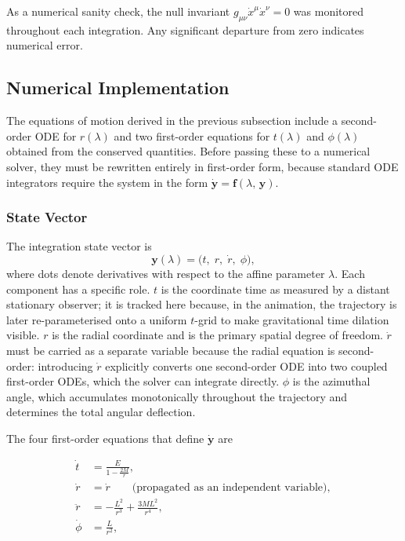 \documentclass[12pt,a4paper]{article}
\begin{document}
As a numerical sanity check, the null invariant $g_{\mu\nu}\dot{x}^\mu\dot{x}^\nu = 0$ was monitored throughout each integration. Any significant departure from zero indicates numerical error.

\subsection{Numerical Implementation}

\label{subsec:numerical_implementation}

The equations of motion derived in the previous subsection include a second-order ODE for $r(\lambda)$ and two first-order equations for $t(\lambda)$ and $\phi(\lambda)$ obtained from the conserved quantities. Before passing these to a numerical solver, they must be rewritten entirely in first-order form, because standard ODE integrators require the system in the form $\dot{\mathbf{y}} = \mathbf{f}(\lambda,\,\mathbf{y})$.

\subsubsection{State Vector}
The integration state vector is
\begin{equation}
    \mathbf{y}(\lambda) = \bigl(t,\; r,\; \dot{r},\; \phi\bigr),
    \label{eq:state_vector}
\end{equation}
where dots denote derivatives with respect to the affine parameter $\lambda$. Each component has a specific role. $t$ is the coordinate time as measured by a distant stationary observer; it is tracked here because, in the animation, the trajectory is later re-parameterised onto a uniform $t$-grid to make gravitational time dilation visible. $r$ is the radial coordinate and is the primary spatial degree of freedom. $\dot{r}$ must be carried as a separate variable because the radial equation is second-order: introducing $\dot{r}$ explicitly converts one second-order ODE into two coupled first-order ODEs, which the solver can integrate directly. $\phi$ is the azimuthal angle, which accumulates monotonically throughout the trajectory and determines the total angular deflection.

The four first-order equations that define $\dot{\mathbf{y}}$ are

\begin{align}
    \dot{t}    &= \frac{E}{\displaystyle 1 - \frac{2M}{r}},
    \label{eq:tdot} \\[6pt]
    \dot{r}    &= \dot{r}
    \qquad \text{(propagated as an independent variable)},
    \label{eq:rdot_prop} \\[6pt]
    \ddot{r}   &= -\frac{L^{2}}{r^{3}} + \frac{3ML^{2}}{r^{4}},
    \label{eq:rddot} \\[6pt]
    \dot{\phi} &= \frac{L}{r^{2}},
    \label{eq:phidot}
\end{align}
\end{document}
